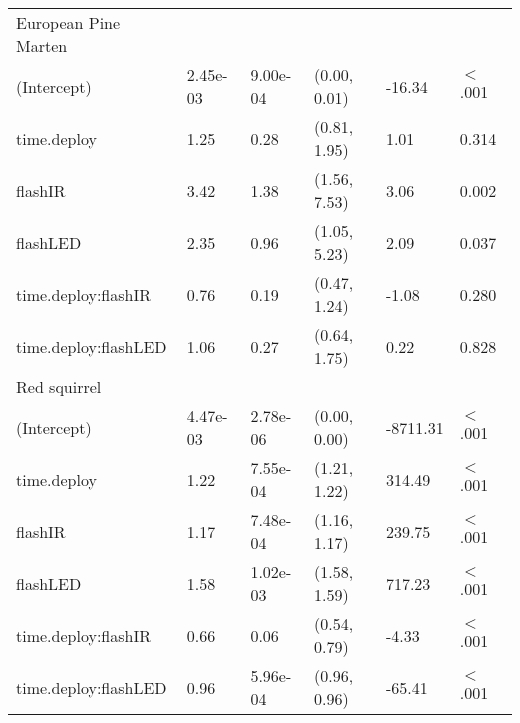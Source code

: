 \begin{table}[ht]
\begin{tabular}{llllll}
  European Pine Marten &  &  &  &  &        \\ 
  (Intercept) & 2.45e-03 & 9.00e-04 & (0.00, 0.01) & -16.34 & $<$ .001 \\ 
  time.deploy & 1.25 & 0.28 & (0.81, 1.95) & 1.01 & 0.314  \\ 
  flashIR & 3.42 & 1.38 & (1.56, 7.53) & 3.06 & 0.002  \\ 
  flashLED & 2.35 & 0.96 & (1.05, 5.23) & 2.09 & 0.037  \\ 
  time.deploy:flashIR & 0.76 & 0.19 & (0.47, 1.24) & -1.08 & 0.280  \\ 
  time.deploy:flashLED & 1.06 & 0.27 & (0.64, 1.75) & 0.22 & 0.828  \\ 
  Red squirrel &  &  &  &  &        \\ 
  (Intercept) & 4.47e-03 & 2.78e-06 & (0.00, 0.00) & -8711.31 & $<$ .001 \\ 
  time.deploy & 1.22 & 7.55e-04 & (1.21, 1.22) & 314.49 & $<$ .001 \\ 
  flashIR & 1.17 & 7.48e-04 & (1.16, 1.17) & 239.75 & $<$ .001 \\ 
  flashLED & 1.58 & 1.02e-03 & (1.58, 1.59) & 717.23 & $<$ .001 \\ 
  time.deploy:flashIR & 0.66 & 0.06 & (0.54, 0.79) & -4.33 & $<$ .001 \\ 
  time.deploy:flashLED & 0.96 & 5.96e-04 & (0.96, 0.96) & -65.41 & $<$ .001 \\ 
   \hline
\end{tabular}
\end{table}
